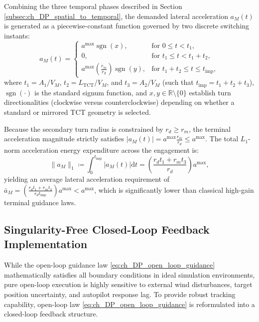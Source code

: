 Combining the three temporal phases described in Section \ref{subsec:ch_DP_spatial_to_temporal}, the demanded lateral acceleration $a_M(t)$ is generated as a piecewise-constant function governed by two discrete switching instants:
\begin{equation}\label{eq:ch_DP_open_loop_guidance}
	a_M(t) = \begin{cases}
		a^{\max} \operatorname{sgn}(x), & \text{for } 0 \le t < t_1, \\
		0, & \text{for } t_1 \le t < t_1 + t_2, \\
		a^{\max} \left( \frac{r_m}{r_d} \right) \operatorname{sgn}(y), & \text{for } t_1 + t_2 \le t \le t_{\text{imp}},
	\end{cases}
\end{equation}
where $t_1 = A_1 / V_M$, $t_2 = L_{\text{TCT}} / V_M$, and $t_3 = A_2 / V_M$ (such that $t_{\text{imp}} = t_1 + t_2 + t_3$), $\operatorname{sgn}(\cdot)$ is the standard signum function, and $x, y \in \mathbb{R} \setminus \{0\}$ establish turn directionalities (clockwise versus counterclockwise) depending on whether a standard or mirrored TCT geometry is selected.

\begin{remark}\label{rem:ch_DP_acceleration_efficiency}
Because the secondary turn radius is constrained by $r_d \ge r_m$, the terminal acceleration magnitude strictly satisfies $|a_M(t)| = a^{\max} \frac{r_m}{r_d} \le a^{\max}$. The total $L_1$-norm acceleration energy expenditure across the engagement is:
\begin{equation}\label{eq:ch_DP_acceleration_energy}
	\|a_M\|_1 \coloneqq \int_0^{t_{\text{imp}}} |a_M(t)| \mathrm{d}t = \left( \frac{r_d t_1 + r_m t_3}{r_d} \right) a^{\max},
\end{equation}
yielding an average lateral acceleration requirement of $\bar{a}_M = \left( \frac{r_d t_1 + r_m t_3}{r_d t_{\text{imp}}} \right) a^{\max} < a^{\max}$, which is significantly lower than classical high-gain terminal guidance laws.
\end{remark}
\subsection{Singularity-Free Closed-Loop Feedback Implementation}\label{subsec:ch_DP_closed_loop}

While the open-loop guidance law \eqref{eq:ch_DP_open_loop_guidance} mathematically satisfies all boundary conditions in ideal simulation environments, pure open-loop execution is highly sensitive to external wind disturbances, target position uncertainty, and autopilot response lag. To provide robust tracking capability, open-loop law \eqref{eq:ch_DP_open_loop_guidance} is reformulated into a closed-loop feedback structure.

